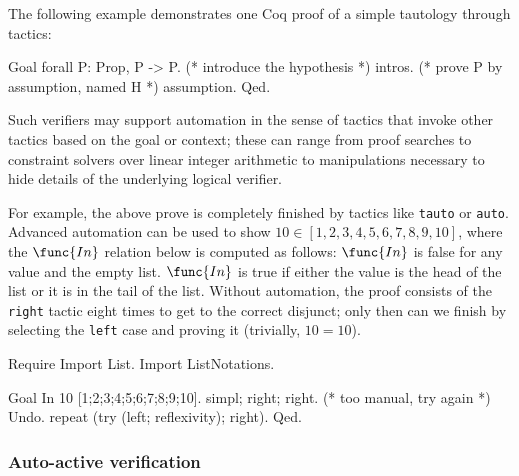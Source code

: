 The following example demonstrates one Coq proof of a simple tautology through
tactics:
\begin{coq_example}
    Goal forall P: Prop, P -> P.
    (* introduce the hypothesis *) intros.
    (* prove P by assumption, named H *) assumption.
    Qed.
\end{coq_example}

Such verifiers may support automation in the sense of tactics that invoke other
tactics based on the goal or context; these can range from proof searches to
constraint solvers over linear integer arithmetic to manipulations necessary to
hide details of the underlying logical verifier.

For example, the above prove is completely finished by tactics like
\texttt{tauto} or \texttt{auto}. Advanced automation can be used to show \(10
\in [1,2,3,4,5,6,7,8,9,10]\), where the \(\func{In}\) relation below is computed
as follows: \(\func{In}\) is false for any value and the empty list.
\(\func{In}\) is true if either the value is the head of the list or it is in
the tail of the list. Without automation, the proof consists of the
\texttt{right} tactic eight times to get to the correct disjunct; only then can
we finish by selecting the \texttt{left} case and proving it (trivially, \(10 =
10\)).

\begin{coq_eval}
    Require Import List.
    Import ListNotations.
\end{coq_eval}
\begin{coq_example}
    Goal In 10 [1;2;3;4;5;6;7;8;9;10].
    simpl; right; right.
    (* too manual, try again *) Undo.
    repeat (try (left; reflexivity); right).
    Qed.
\end{coq_example}

\subsubsection{Auto-active verification}

